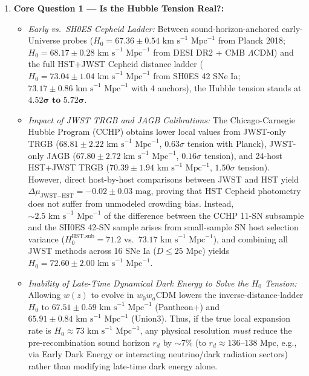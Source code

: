 \documentclass[aps,prd,preprint,superscriptaddress,nofootinbib]{revtex4-2}
\begin{document}
\begin{enumerate}
    \setlength{\itemsep}{4pt}
    \item \textbf{Core Question 1 --- Is the Hubble Tension Real?:}
    \begin{itemize}
        \setlength{\itemsep}{2pt}
        \item \emph{Early vs.\ SH0ES Cepheid Ladder:} Between sound-horizon-anchored early-Universe probes ($H_0 = 67.36 \pm 0.54\text{ km s}^{-1}\text{ Mpc}^{-1}$ from Planck 2018; $H_0 = 68.17 \pm 0.28\text{ km s}^{-1}\text{ Mpc}^{-1}$ from DESI DR2 + CMB $\Lambda$CDM) and the full HST+JWST Cepheid distance ladder ($H_0 = 73.04 \pm 1.04\text{ km s}^{-1}\text{ Mpc}^{-1}$ from SH0ES 42 SNe Ia; $73.17 \pm 0.86\text{ km s}^{-1}\text{ Mpc}^{-1}$ with 4 anchors), the Hubble tension stands at $\mathbf{4.52}\boldsymbol{\sigma}\textbf{ to }\mathbf{5.72}\boldsymbol{\sigma}$.
        \item \emph{Impact of JWST TRGB and JAGB Calibrations:} The Chicago-Carnegie Hubble Program (CCHP) obtains lower local values from JWST-only TRGB ($68.81 \pm 2.22\text{ km s}^{-1}\text{ Mpc}^{-1}$, $0.63\sigma$ tension with Planck), JWST-only JAGB ($67.80 \pm 2.72\text{ km s}^{-1}\text{ Mpc}^{-1}$, $0.16\sigma$ tension), and 24-host HST+JWST TRGB ($70.39 \pm 1.94\text{ km s}^{-1}\text{ Mpc}^{-1}$, $1.50\sigma$ tension). However, direct host-by-host comparisons between JWST and HST yield $\Delta\mu_{\text{JWST}-\text{HST}} = -0.02 \pm 0.03\text{ mag}$, proving that HST Cepheid photometry does not suffer from unmodeled crowding bias. Instead, $\sim 2.5\text{ km s}^{-1}\text{ Mpc}^{-1}$ of the difference between the CCHP 11-SN subsample and the SH0ES 42-SN sample arises from small-sample SN host selection variance ($H_0^{\text{HST,sub}} = 71.2$ vs.\ $73.17\text{ km s}^{-1}\text{ Mpc}^{-1}$), and combining all JWST methods across 16 SNe Ia ($D \le 25\text{ Mpc}$) yields $H_0 = 72.60 \pm 2.00\text{ km s}^{-1}\text{ Mpc}^{-1}$.
        \item \emph{Inability of Late-Time Dynamical Dark Energy to Solve the $H_0$ Tension:} Allowing $w(z)$ to evolve in $w_0 w_a$CDM lowers the inverse-distance-ladder $H_0$ to $67.51 \pm 0.59\text{ km s}^{-1}\text{ Mpc}^{-1}$ (Pantheon+) and $65.91 \pm 0.84\text{ km s}^{-1}\text{ Mpc}^{-1}$ (Union3). Thus, if the true local expansion rate is $H_0 \approx 73\text{ km s}^{-1}\text{ Mpc}^{-1}$, any physical resolution \emph{must} reduce the pre-recombination sound horizon $r_d$ by $\sim 7\%$ (to $r_d \approx 136\text{--}138\text{ Mpc}$, e.g., via Early Dark Energy or interacting neutrino/dark radiation sectors) rather than modifying late-time dark energy alone.

\end{itemize}
\end{enumerate}
\end{document}
